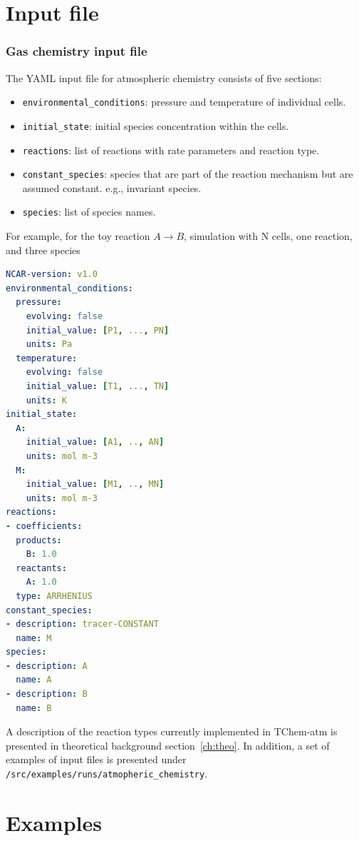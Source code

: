 \documentclass[report, 12pt]{SANDreport}
\begin{document}
\chapter{Input file}

\subsection{Gas chemistry input file}

The YAML input file for atmospheric chemistry consists of five sections:

\begin{itemize}
\item \verb|environmental_conditions|: pressure and temperature of individual cells.
\item \verb|initial_state|: initial species concentration within the cells.
\item \verb|reactions|: list of reactions with rate parameters and reaction type.
\item \verb|constant_species|: species that are part of the reaction mechanism but are assumed constant.
e.g., invariant species.
\item \verb|species|: list of species names.
\end{itemize}

For example, for the toy reaction $A \rightarrow B$, simulation with N cells, one reaction, and three species


\begin{lstlisting}[language=yaml]
NCAR-version: v1.0
environmental_conditions:
  pressure:
    evolving: false
    initial_value: [P1, ..., PN]
    units: Pa
  temperature:
    evolving: false
    initial_value: [T1, ..., TN]
    units: K
initial_state:
  A:
    initial_value: [A1, .., AN]
    units: mol m-3
  M:
    initial_value: [M1, .., MN]
    units: mol m-3
reactions:
- coefficients:
  products:
    B: 1.0
  reactants:
    A: 1.0
  type: ARRHENIUS
constant_species:
- description: tracer-CONSTANT
  name: M
species:
- description: A
  name: A
- description: B
  name: B
\end{lstlisting}

A description of the reaction types currently implemented in TChem-atm is presented in theoretical background section~\ref{ch:theo}. In addition, a set of examples of input files is presented under \Verb|/src/examples/runs/atmopheric_chemistry|.

\chapter{Examples}
\end{document}

